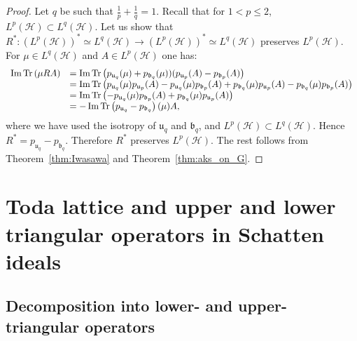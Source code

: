\documentclass[a4paper,12pt,reqno]{amsart}%
\theoremstyle{definition}
\theoremstyle{remark}
\numberwithin{theorem}{section}
\numberwithin{equation}{section}
\newcommand{\1}{{\bf 1}}
\DeclareMathOperator{\Tr}{\textnormal{Tr}}
\DeclareMathOperator{\im}{\textnormal{Im}}
\begin{document}
\begin{proof}
Let $q$ be such that $\frac{1}{p}+\frac{1}{q} = 1$. Recall that for $1<p\leq 2$, $L^p(\mathcal{H})\subset L^q(\mathcal{H})$.
    Let us show that $R^*: (L^p(\mathcal{H}))^*\simeq L^q(\mathcal{H}) \rightarrow (L^p(\mathcal{H}))^*\simeq L^q(\mathcal{H})$ preserves $L^p(\mathcal{H})$. For $\mu \in L^q(\mathcal{H})$ and $A\in L^p(\mathcal{H})$ one has:
    \[
    \begin{array}{ll}
\im \Tr \left(\mu RA\right) & = \im \Tr \left(p_{\mathfrak{u}_q}(\mu) + p_{\mathfrak{b}_q}(\mu))(p_{\mathfrak{u}_p}(A)-p_{\mathfrak{b}_p}(A)\right) \\ & = \im \Tr\left(p_{\mathfrak{u}_q}(\mu) p_{\mathfrak{u}_p}(A) - p_{\mathfrak{u}_q}(\mu) p_{\mathfrak{b}_p}(A) + p_{\mathfrak{b}_q}(\mu) p_{\mathfrak{u}_p}(A) - p_{\mathfrak{b}_q}(\mu) p_{\mathfrak{b}_p}(A)\right)\\
& = \im \Tr\left(- p_{\mathfrak{u}_q}(\mu) p_{\mathfrak{b}_p}(A) + p_{\mathfrak{b}_q}(\mu) p_{\mathfrak{u}_p}(A)\right) \\ &
= - \im \Tr \left(p_{\mathfrak{u}_q}-p_{\mathfrak{b}_q}\right)(\mu) A,
\end{array}
    \]
    where we have used the isotropy of $\mathfrak{u}_q$ and $\mathfrak{b}_q$, and  $L^p(\mathcal{H})\subset L^q(\mathcal{H})$. Hence $R^* = p_{\mathfrak{u}_q}-p_{\mathfrak{b}_q}$. Therefore $R^*$ preserves $L^p(\mathcal{H})$. The rest follows from Theorem~\ref{thm:Iwasawa} and  Theorem~\ref{thm:aks_on_G}.
\end{proof}
\section{Toda lattice and upper and lower triangular operators in Schatten ideals}\label{Lptriangle}


\subsection{Decomposition into lower- and upper-triangular operators}\label{sec:dec_up_down}
\end{document}
